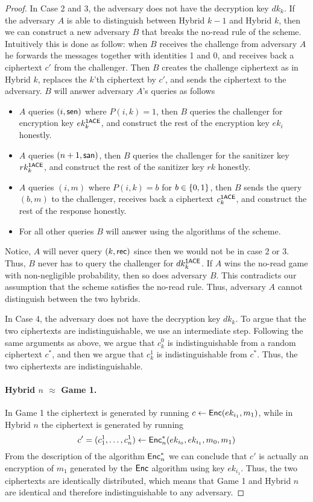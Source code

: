 \documentclass{llncs}
\begin{document}
\begin{proof}
In Case 2 and 3, the adversary does not have the decryption key $dk_k$. If the adversary $A$ is able to distinguish between Hybrid $k-1$ and Hybrid $k$, then we can construct a new adversary $B$ that breaks the no-read rule of the \oACE scheme. 
Intuitively this is done as follow: when $B$ receives the challenge from adversary $A$ he forwards the messages together with identities 1 and 0, and receives back a \oACE ciphertext $c'$ from the \oACE challenger. Then $B$ creates the challenge ciphertext as in Hybrid $k$, replaces the $k$'th \oACE ciphertext by $c'$, and sends the ciphertext to the adversary. 
$B$ will answer adversary $A$'s queries as follows
\begin{itemize}
\item $A$ queries $(i,\mathsf{sen})$ where $P(i,k) = 1$, then $B$ queries the challenger for encryption key $ek_k^{\mathsf{1ACE}}$, and construct the rest of the encryption key $ek_i$ honestly.
\item $A$ queries $(n+1,\mathsf{san})$, then $B$ queries the challenger for the sanitizer key $rk_k^{\mathsf{1ACE}}$, and construct the rest of the sanitizer key $rk$ honestly.
\item $A$ queries $(i,m)$ where $P(i,k) = b$ for $b\in\{0,1\}$, then $B$ sends the query $(b,m)$ to the challenger, receives back a ciphertext $c_k^{\mathsf{1ACE}}$, and construct the rest of the response honestly. 
\item For all other queries $B$ will answer using the algorithms of the scheme.
\end{itemize}
Notice, $A$ will never query $(k,\mathsf{rec})$ since then we would not be in case 2 or 3. Thus, $B$ never has to query the challenger for $dk_k^{\mathsf{1ACE}}$.
If $A$ wins the no-read game with non-negligible probability, then so does adversary $B$. This contradicts our assumption that the \oACE scheme satisfies the no-read rule. Thus, adversary $A$ cannot distinguish between the two hybrids.






In Case 4, the adversary does not have the decryption key $dk_k$. To argue that the two ciphertexts are indistinguishable, we use an intermediate step. Following the same arguments as above, we argue that $c_k^0$ is indistinguishable from a random ciphertext $c^*$, and then we argue that $c_k^1$ is indistinguishable from $c^*$.
Thus, the two ciphertexts are indistinguishable.


\paragraph{Hybrid $n$ $\approx$ Game 1.} 
In  Game 1 the ciphertext is generated by running $c \gets \mathsf{Enc}(ek_{i_1},m_1)$, while in Hybrid $n$ the ciphertext is generated by running $$c' = (c_1^1,\dots,c_n^1) \gets \mathsf{Enc}_n^*(ek_{i_0},ek_{i_1},m_0,m_1)$$
From the description of the algorithm $\mathsf{Enc}_n^*$ we can conclude that $c'$ is actually an encryption of $m_1$ generated by the $\mathsf{Enc}$ algorithm using key $ek_{i_1}$.
Thus, the two ciphertexts are identically distributed, which means that Game 1 and Hybrid $n$ are identical and therefore indistinguishable to any adversary.


\end{proof}
\end{document}
